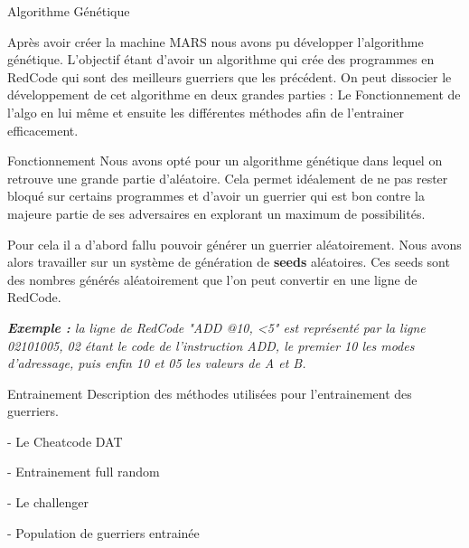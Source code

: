 \documentclass[a4paper, 10pt]{article}
\begin{document}
    \begin{section}{Algorithme Génétique}
        \par
            Après avoir créer la machine MARS nous avons pu développer l'algorithme génétique. L'objectif étant d'avoir un algorithme qui crée des programmes en RedCode qui sont des meilleurs guerriers que les précédent. On peut dissocier le développement de cet algorithme en deux grandes parties : Le Fonctionnement de l'algo en lui même et ensuite les différentes méthodes afin de l'entrainer efficacement.
            \medskip

        \begin{subsection}{Fonctionnement}
            \sloppypar
                Nous avons opté pour un algorithme génétique dans lequel on retrouve une grande partie d'aléatoire. Cela permet idéalement de ne pas rester bloqué sur certains programmes et d'avoir un guerrier qui est bon contre la majeure partie de ses adversaires en explorant un maximum de possibilités.
                \smallskip
            \par
                Pour cela il a d'abord fallu pouvoir générer un guerrier aléatoirement. Nous avons alors travailler sur un système de génération de \textbf{seeds} aléatoires. Ces seeds sont des nombres générés aléatoirement que l'on peut convertir en une ligne de RedCode. 
                \medskip
            \par
                \textit{\textbf{Exemple :} la ligne de RedCode "ADD @10, <5" est représenté par la ligne 02101005, 02 étant le code de l'instruction ADD, le premier 10 les modes d'adressage, puis enfin 10 et 05 les valeurs de A et B.}

        \end{subsection}

        \begin{subsection}{Entrainement}
            Description des méthodes utilisées pour l'entrainement des guerriers.

                - Le Cheatcode DAT

                - Entrainement full random

                - Le challenger

                - Population de guerriers entrainée
        \end{subsection}
    \end{section}
\end{document}
